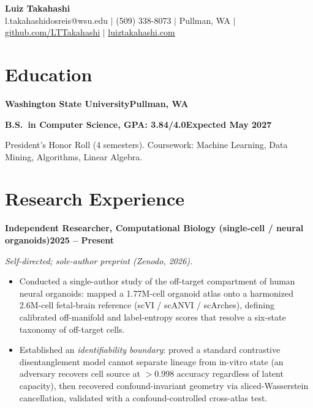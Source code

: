 \documentclass[10pt]{article}
\newcommand{\role}[2]{\noindent\textbf{#1}\hfill\textbf{#2}\par}
\newcommand{\sub}[1]{\noindent\textit{#1}\par\vspace{1.5pt}}
\begin{document}
\begin{center}
{\LARGE\bfseries Luiz Takahashi}\\[1pt]
{\small l.takahashidosreis@wsu.edu $\mid$ (509) 338-8073 $\mid$ Pullman, WA $\mid$ \href{https://github.com/LTTakahashi}{github.com/LTTakahashi} $\mid$ \href{https://luiztakahashi.com}{luiztakahashi.com}}
\end{center}
\vspace{-3pt}

\section{Education}
\role{Washington State University}{Pullman, WA}
\role{B.S.\ in Computer Science, GPA: 3.84/4.0}{Expected May 2027}
President's Honor Roll (4 semesters). Coursework: Machine Learning, Data Mining, Algorithms, Linear Algebra.

\section{Research Experience}

\role{Independent Researcher, Computational Biology (single-cell / neural organoids)}{2025 -- Present}
\sub{Self-directed; sole-author preprint (Zenodo, 2026).}
\begin{itemize}
\item Conducted a single-author study of the off-target compartment of human neural organoids: mapped a 1.77M-cell organoid atlas onto a harmonized 2.6M-cell fetal-brain reference (scVI / scANVI / scArches), defining calibrated off-manifold and label-entropy scores that resolve a six-state taxonomy of off-target cells.
\item Established an \textit{identifiability boundary}: proved a standard contrastive disentanglement model cannot separate lineage from in-vitro state (an adversary recovers cell source at $>$0.998 accuracy regardless of latent capacity), then recovered confound-invariant geometry via sliced-Wasserstein cancellation, validated with a confound-controlled cross-atlas test.
\end{itemize}
\end{document}
